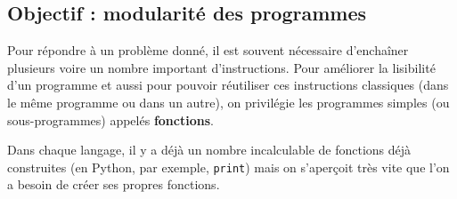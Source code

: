 \subsection{Objectif : modularité des programmes}

Pour répondre à un problème donné, il est souvent nécessaire d'enchaîner plusieurs voire un nombre 
important d'instructions. Pour améliorer la lisibilité d'un programme et aussi pour pouvoir réutiliser 
ces instructions classiques (dans le même programme ou dans un autre),
on privilégie les programmes simples (ou sous-programmes) appelés \textbf{fonctions}.

Dans chaque langage, il y a déjà un nombre incalculable de fonctions déjà construites (en Python, 
par exemple, \texttt{print}) mais on s'aperçoit très vite que l'on a besoin de créer ses propres 
fonctions.


%
%
%
%
%
%

